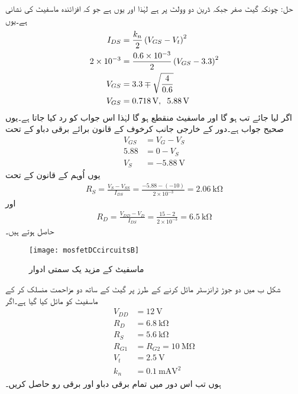 حل: چونکہ گیٹ صفر جبکہ ڈرین دو وولٹ پر ہے لہٰذا  اور یوں   ہے جو کہ افزائندہ ماسفیٹ کی نشانی ہے۔یوں
\begin{align*}
I_{DS}&=\frac{k_n}{2} \left(V_{GS}-V_t \right )^{2}\\
2 \times 10^{-3}&=\frac{0.6 \times 10^{-3}}{2} \left(V_{GS}-3.3 \right )^{2}\\
V_{GS}&=3.3 \mp \sqrt{\frac{4}{0.6}}\\
V_{GS}&=\SI{0.718}{\volt}, \hspace{2mm} \SI{5.88}{\volt}
\end{align*}
اگر   لیا جائے تب   ہو گا اور ماسفیٹ منقطع ہو گا لہٰذا اس جواب کو رد کیا جاتا ہے۔یوں  صحیح جواب ہے۔دور کے خارجی جانب کرخوف کے قانون برائے برقی دباو کے تحت
\begin{align*}
V_{GS}&=V_G  - V_S\\
5.88&=0-V_S\\
V_S&=\SI{-5.88}{\volt}
\end{align*}
یوں اُوہم کے قانون کے تحت
\begin{align*}
R_S=\frac{V_S-V_{SS}}{I_{DS}}=\frac{-5.88-(-10)}{2 \times 10^{-3}}=\SI{2.06}{\kilo \ohm}
\end{align*}
اور
\begin{align*}
R_D=\frac{V_{DD}-V_{D}}{I_{DS}}=\frac{15-2}{2 \times 10^{-3}}=\SI{6.5}{\kilo \ohm}
\end{align*}
حاصل ہوتے ہیں۔
\begin{figure}
\centering
\texttt{[image: mosfetDCcircuitsB]}
\caption{ماسفیٹ کے مزید یک سمتی ادوار}
\label{شکل_ماسفیٹ_کے_یک_سمتی_ادوار_ب}
\end{figure}
شکل  ب میں دو جوڑ ٹرانزسٹر مائل کرنے کے طرز پر گیٹ کے ساتھ دو مزاحمت منسلک کر کے ماسفیٹ کو مائل کیا گیا ہے۔اگر
\begin{align*}
V_{DD}&=\SI{12}{\volt}\\
R_D&=\SI{6.8}{\kilo \ohm}\\
R_S&=\SI{5.6}{\kilo \ohm}\\
R_{G1}&=R_{G2}=\SI{10}{\mega \ohm}\\
V_t&=\SI{2.5}{\volt}\\
k_n&=\SI{0.1}{\milli \ampere \volt \squared}
\end{align*}
ہوں تب اس دور میں تمام برقی دباو اور برقی رو حاصل کریں۔

